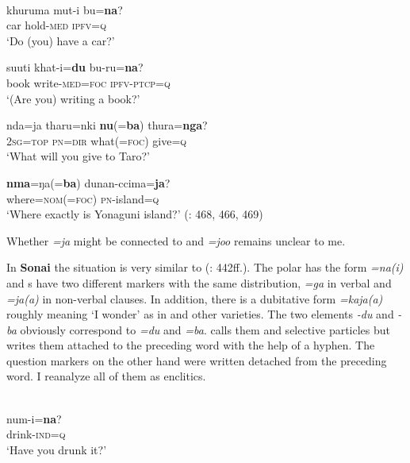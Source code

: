 \ea%
    \label{ex:japa:50}
    \\
    \ea
    \gll khuruma  mut-i    bu=\textbf{{na}}?\\
    car    hold-\textsc{med}  \textsc{ipfv}=\textsc{q}\\
    \glt ‘Do (you) have a car?’
    
    \ex
    \gll suuti  khat-i=\textbf{{du}} bu-ru=\textbf{{na}}?\\
    book  write-\textsc{med}=\textsc{foc}  \textsc{ipfv}-\textsc{ptcp}=\textsc{q}\\
    \glt ‘(Are you) writing a book?’
    
    \ex
    \gll nda=ja    tharu=nki \textbf{{nu}}(=\textbf{{ba}})  thura=\textbf{{nga}}?\\
    2\textsc{sg}=\textsc{top}  \textsc{pn}=\textsc{dir}    what(=\textsc{foc})  give=\textsc{q}\\
    \glt ‘What will you give to Taro?’
    
    \ex
    \gll \textbf{{nma}}=ŋa(=\textbf{{ba}})    dunan-ccima=\textbf{{ja}}?\\
    where=\textsc{nom}(=\textsc{foc})  \textsc{pn}-island=\textsc{q}\\
    \glt ‘Where exactly is Yonaguni island?’ (\citealt{YamadaPellardShimoji2015}: 468, 466, 469)\z\z

\noindent Whether \textit{=ja} might be connected to  and  \textit{=joo} remains unclear to me.

In \textbf{Sonai} the situation is very similar to  (\citealt{Izuyama2012}: 442ff.). The polar  has the form \textit{=na(i)} and s have two different markers with the same distribution, \textit{=ga} in verbal and \textit{=ja(a)} in non-verbal clauses. In addition, there is a dubitative form \textit{=kaja(a)} roughly meaning ‘I wonder’ as in  and other varieties. The two elements \textit{-du} and \textit{-ba} obviously correspond to  \textit{=du} and \textit{=ba}. \citet[443]{Izuyama2012} calls them  and selective particles but writes them attached to the preceding word with the help of a hyphen. The question markers on the other hand were written detached from the preceding word. I reanalyze all of them as enclitics.

\ea%
    \label{ex:japa:51}
    \\
    \ea
    \gll num-i=\textbf{{na}}?\\
    drink-\textsc{ind}=\textsc{q}\\
    \glt ‘Have you drunk it?’
    
